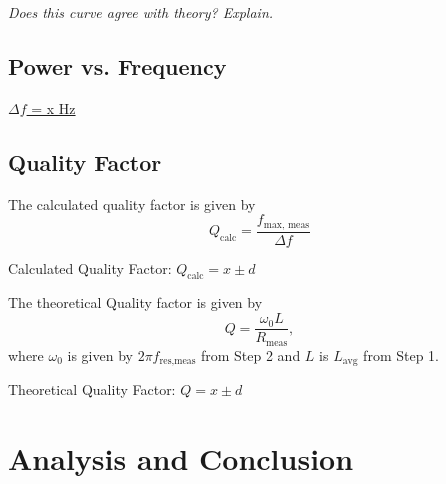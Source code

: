 \documentclass[twocolumn,english]{IEEEtran}
\theoremstyle{plain}
\theoremstyle{plain}
\begin{document}
\textit{Does this curve agree with theory? Explain.}

\hrulefill

\subsection{Power vs. Frequency}


\underline{$\Delta f$ = x Hz}

\hrulefill

\subsection{Quality Factor}
The calculated quality factor is given by
\begin{equation}
	Q_{\text{calc}} = \frac{f_{\text{max, meas}}}{\Delta f}
\end{equation}

Calculated Quality Factor: \underline{$Q_{\text{calc}} = x\pm d$}

The theoretical Quality factor is given by
\begin{equation}
	Q = \frac{\omega_0 L}{R_{\text{meas}}},
\end{equation}
where $\omega_0$ is given by $2\pi f_{\text{res,meas}}$ from Step 2 and $L$ is $L_{\text{avg}}$ from Step 1.

Theoretical Quality Factor: \underline{$Q = x\pm d$}

\hrulefill

\section{Analysis and Conclusion}

%
%
\end{document}
